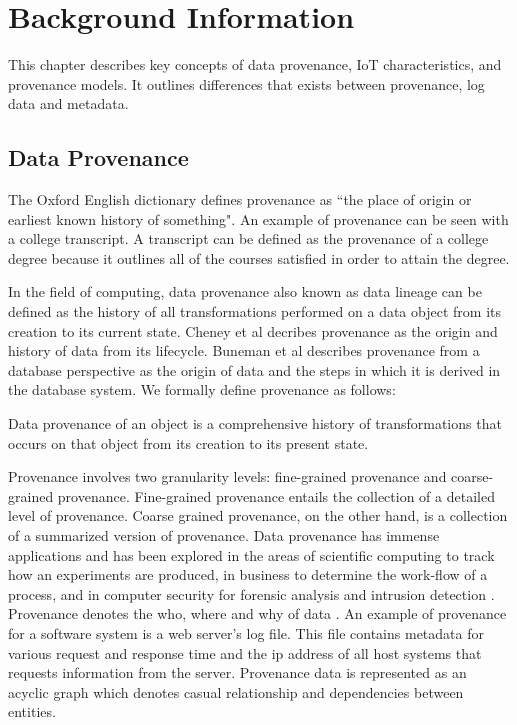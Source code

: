 \chapter{Background Information}

This chapter describes key concepts of data provenance, IoT characteristics, and provenance models. It outlines differences that exists between provenance, log data and metadata. 

\section{Data Provenance}
The Oxford English dictionary defines provenance \cite{TCDP1999} as ``the place of origin or earliest known history of something".  An example of provenance can be seen with a college transcript. A transcript can be defined as the provenance of a college degree because it outlines all of the courses satisfied in order to attain the degree.
\par In the field of computing, data provenance also known as  data lineage can be defined as the history of all transformations performed on a data object from its creation to its current state. Cheney et al \cite{cheney_provenance_2009} decribes provenance as the origin and history of data from its lifecycle. Buneman et al \cite{buneman_why_2001} describes provenance from a database perspective as the origin of data and the steps in which it is derived in the database system.  We formally define provenance as follows:


\begin{definition}

Data provenance of an object is a comprehensive history of transformations that occurs on that object from its creation to its present state.

\end{definition}

Provenance involves two granularity levels: fine-grained provenance and coarse-grained provenance. Fine-grained provenance \cite{glavic_case_2011} entails the collection of a detailed level of provenance. Coarse grained provenance, on the other hand, is a collection of a summarized version of provenance. Data provenance has immense applications and has been explored in the areas of scientific computing \cite{groth, altintas} to track how an experiments are produced, in business to determine the work-flow of  a process, and in computer security for forensic analysis and intrusion detection \cite{bates_towards_2013, muniswamy_reddy_provenance_2010, muniswamy_reddy} . Provenance denotes the who, where and why of data \cite{cheney_provenance_2009}. An example of provenance for a software system is a web server's log file. This file contains metadata for various request and response time and the ip address of all host systems that requests information from the server. Provenance data is represented as an acyclic graph which denotes casual relationship and dependencies between entities.




